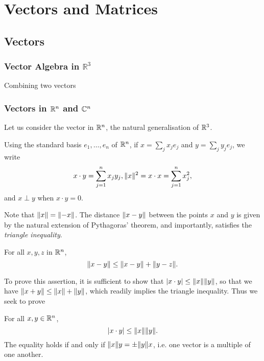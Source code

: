 \documentclass[main.tex]{subfiles}
\begin{document}
\chapter{Vectors and Matrices}
	\section{Vectors}
		\subsection{Vector Algebra in $\mathbb{R}^3$}
			Combining two vectors
		
		\subsection{Vectors in $\mathbb R^n$ and $\mathbb C^n$}
			Let us consider the vector in $\mathbb R^n$, the natural generalisation of $\mathbb R^3$.
			\begin{definition}
				Using the standard basis $e_1, \ldots, e_n$ of $\mathbb R^n$, if $x = \sum_j x_j e_j$ and $y = \sum_j y_j e_j$, we write
				\begin{equation*}
					x \cdot y = \sum_{j = 1}^{n} x_j y_j, \lVert x\rVert^2 = x \cdot x = \sum_{j = 1}^{n} x^2_j,
				\end{equation*}
				and $x \perp y$ when $x\cdot y = 0$.
			\end{definition}
		Note that $\lVert x\rVert = \lVert-x\rVert$. The distance $\lVert x - y\rVert$ between the points $x$ and $y$ is given by the natural extension of Pythagoras' theorem, and importantly, satisfies the \textit{triangle inequality}.
		\begin{theorem}
			For all $x, y, z$ in $\mathbb R^n$,
			\begin{equation}
				\lVert x - y\rVert \leq \lVert x - y\rVert + \lVert y - z\rVert.
			\end{equation}
		\end{theorem}
		To prove this assertion, it is sufficient to show that $\lvert x \cdot y\rvert \leq \lVert x\rVert \lVert y\rVert$, so that we have $\lVert x + y\rVert \leq \lVert x\rVert + \lVert y\rVert$, which readily implies the triangle inequality. Thus we seek to prove
		\begin{theorem}
			For all $x, y \in \mathbb R^n$,
			\begin{equation}
				\lvert x \cdot y\rvert \leq \lVert x\rVert \lVert y\rVert.
			\end{equation}
			The equality holds if and only if $\lVert x\rVert y = \pm \lVert y\rVert x$, i.e. one vector is a multiple of one another. 
		\end{theorem}
\end{document}

